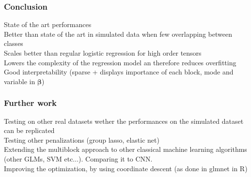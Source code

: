 \documentclass{beamer}
\begin{document}
\begin{frame}
    \frametitle{Conclusion}
    State of the art performances\\[15 pt]
    Better than state of the art in simulated data when few overlapping between classes\\[15 pt]
    Scales better than regular logistic regression for high order tensors\\[15 pt]
    Lowers the complexity of the regression model an therefore reduces overfitting\\[15 pt]
    Good interpretability (sparse + displays importance of each block, mode and variable in $\bm{\beta}$)

\end{frame}




\begin{frame}
    \frametitle{Further work}
    Testing on other real datasets wether the performances on the simulated dataset can be replicated\\[10 pt]
    Testing other penalizations (group lasso, elastic net)\\[10 pt]
    Extending the multiblock approach to other classical machine learning algorithms (other GLMs, SVM etc...). Comparing it to CNN.\\[10 pt]
    Improving the optimization, by using coordinate descent (as done in glmnet \cite{glmnet} in R)
\end{frame}
\end{document}
